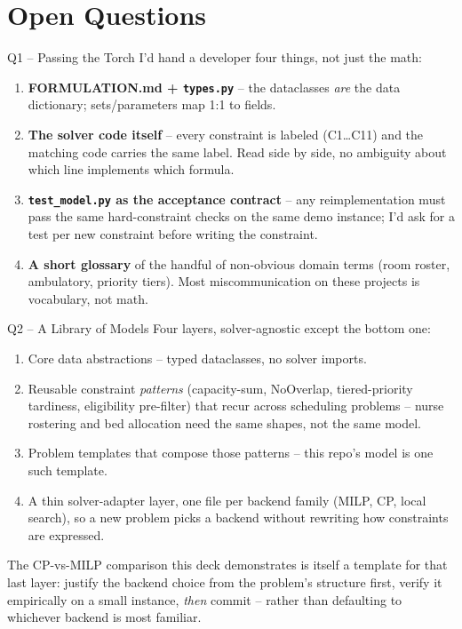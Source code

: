 \documentclass[aspectratio=169]{beamer}
\begin{document}
\section{Open Questions}

\begin{frame}{Q1 -- Passing the Torch}
  \small I'd hand a developer four things, not just the math:
  \begin{enumerate}
    \item \textbf{FORMULATION.md + \texttt{types.py}} -- the dataclasses
      \emph{are} the data dictionary; sets/parameters map 1:1 to fields.
    \item \textbf{The solver code itself} -- every constraint is labeled (C1\ldots C11)
      and the matching code carries the same label. Read side by side, no ambiguity
      about which line implements which formula.
    \item \textbf{\texttt{test\_model.py} as the acceptance contract} -- any
      reimplementation must pass the same hard-constraint checks on the same demo
      instance; I'd ask for a test per new constraint before writing the constraint.
    \item \textbf{A short glossary} of the handful of non-obvious domain terms (room
      roster, ambulatory, priority tiers). Most miscommunication on these projects is
      vocabulary, not math.
  \end{enumerate}
\end{frame}

\begin{frame}{Q2 -- A Library of Models}
  \small Four layers, solver-agnostic except the bottom one:
  \begin{enumerate}
    \item Core data abstractions -- typed dataclasses, no solver imports.
    \item Reusable constraint \emph{patterns} (capacity-sum, NoOverlap,
      tiered-priority tardiness, eligibility pre-filter) that recur across
      scheduling problems -- nurse rostering and bed allocation need the same
      shapes, not the same model.
    \item Problem templates that compose those patterns -- this repo's model is one
      such template.
    \item A thin solver-adapter layer, one file per backend family (MILP, CP, local
      search), so a new problem picks a backend without rewriting how constraints
      are expressed.
  \end{enumerate}
  \vfill
  The CP-vs-MILP comparison this deck demonstrates is itself a template for that last
  layer: justify the backend choice from the problem's structure first, verify it
  empirically on a small instance, \emph{then} commit -- rather than defaulting to
  whichever backend is most familiar.
\end{frame}
\end{document}
